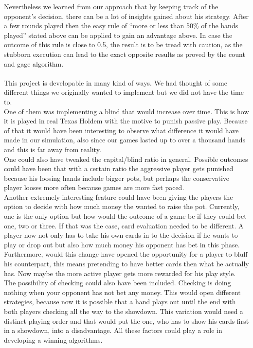 \documentclass[11pt]{article}
\begin{document}
Nevertheless we learned from our approach that by keeping track of the opponent’s decision, there can be a lot of insights gained about his strategy. After a few rounds played then the easy rule of “more or less than 50\% of the hands played” stated above can be applied to gain an advantage above. In case the outcome of this rule is close to 0.5, the result is to be tread with caution, as the stubborn execution can lead to the exact opposite results as proved by the count and gage algorithm.\\ \\

This project is developable in many kind of ways. We had thought of some different things we originally wanted to implement but we did not have the time to. \\
One of them was implementing a blind that would increase over time. This is how it is played in real Texas Holdem with the motive to punish passive play. Because of that it would have been interesting to observe what difference it would have made in our simulation, also since our games lasted up to over a thousand hands and this is far away from reality.\\

One could also have tweaked the capital/blind ratio in general. Possible outcomes could have been that with a certain ratio the aggressive player gets punished because his loosing hands include bigger pots, but perhaps the conservative player looses more often because games are more fast paced.\\

Another extremely interesting feature could have been giving the players the option to decide with how much money the wanted to raise the pot. Currently, one is the only option but how would the outcome of a game be if they could bet one, two or three. If that was the case, card evaluation needed to be different. A player now not only has to take his own cards in to the decision if he wants to play or drop out but also how much money his opponent has bet in this phase. Furthermore, would this change have opened the opportunity for a player to bluff his counterpart, this means pretending to have better cards then what he actually has. Now maybe the more active player gets more rewarded for his play style.\\

The possibility of checking could also have been included. Checking is doing nothing when your opponent has not bet any money. This would open different strategies, because now it is possible that a hand plays out until the end with both players checking all the way to the showdown. This variation would need a distinct playing order and that would put the one, who has to show his cards first in a showdown, into a disadvantage. All these factors could play a role in developing a winning algorithms.\\
\end{document}
